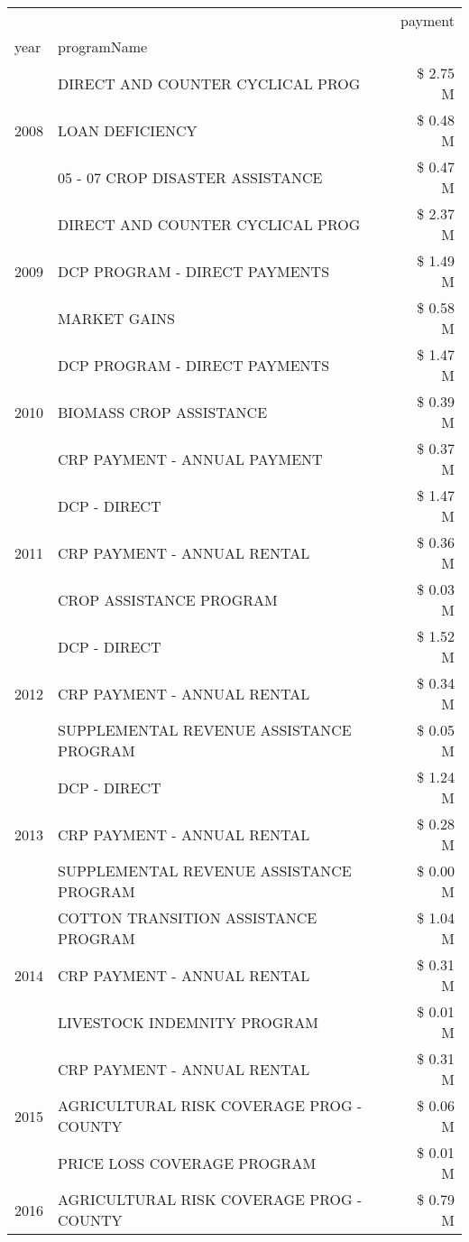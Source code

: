 \begin{tabular}{llr}
\toprule
 &  & payment \\
year & programName &  \\
\midrule
\multirow[t]{3}{*}{2008} & DIRECT AND COUNTER CYCLICAL PROG & \$ 2.75 M \\
 & LOAN DEFICIENCY & \$ 0.48 M \\
 & 05 - 07 CROP DISASTER ASSISTANCE & \$ 0.47 M \\
\cline{1-3}
\multirow[t]{3}{*}{2009} & DIRECT AND COUNTER CYCLICAL PROG & \$ 2.37 M \\
 & DCP PROGRAM - DIRECT PAYMENTS & \$ 1.49 M \\
 & MARKET GAINS & \$ 0.58 M \\
\cline{1-3}
\multirow[t]{3}{*}{2010} & DCP PROGRAM - DIRECT PAYMENTS & \$ 1.47 M \\
 & BIOMASS CROP ASSISTANCE & \$ 0.39 M \\
 & CRP PAYMENT - ANNUAL PAYMENT & \$ 0.37 M \\
\cline{1-3}
\multirow[t]{3}{*}{2011} & DCP - DIRECT & \$ 1.47 M \\
 & CRP PAYMENT - ANNUAL RENTAL & \$ 0.36 M \\
 & CROP ASSISTANCE PROGRAM & \$ 0.03 M \\
\cline{1-3}
\multirow[t]{3}{*}{2012} & DCP - DIRECT & \$ 1.52 M \\
 & CRP PAYMENT - ANNUAL RENTAL & \$ 0.34 M \\
 & SUPPLEMENTAL REVENUE ASSISTANCE PROGRAM & \$ 0.05 M \\
\cline{1-3}
\multirow[t]{3}{*}{2013} & DCP - DIRECT & \$ 1.24 M \\
 & CRP PAYMENT - ANNUAL RENTAL & \$ 0.28 M \\
 & SUPPLEMENTAL REVENUE ASSISTANCE PROGRAM & \$ 0.00 M \\
\cline{1-3}
\multirow[t]{3}{*}{2014} & COTTON TRANSITION ASSISTANCE PROGRAM & \$ 1.04 M \\
 & CRP PAYMENT - ANNUAL RENTAL & \$ 0.31 M \\
 & LIVESTOCK INDEMNITY PROGRAM & \$ 0.01 M \\
\cline{1-3}
\multirow[t]{3}{*}{2015} & CRP PAYMENT - ANNUAL RENTAL & \$ 0.31 M \\
 & AGRICULTURAL RISK COVERAGE PROG - COUNTY & \$ 0.06 M \\
 & PRICE LOSS COVERAGE PROGRAM & \$ 0.01 M \\
\cline{1-3}
\multirow[t]{3}{*}{2016} & AGRICULTURAL RISK COVERAGE PROG - COUNTY      & \$ 0.79 M \\

\end{tabular}
